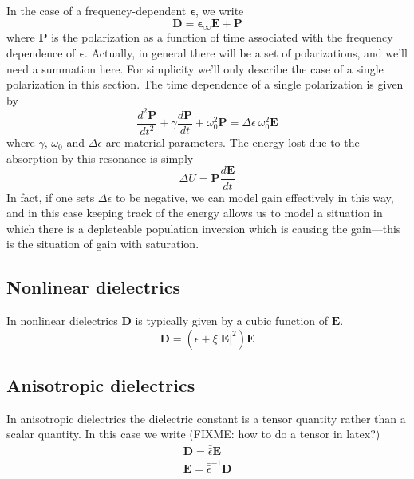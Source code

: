 \documentclass[floats]{book}
\begin{document}
In the case of a frequency-dependent $\mathbf \epsilon$, we write
\begin{equation}
\mathbf D = \mathbf \epsilon_{\infty} \mathbf E + \mathbf P
\end{equation}
where $\mathbf P$ is the polarization as a function of time associated with
the frequency dependence of $\mathbf \epsilon$.  Actually, in general there
will be a set of polarizations, and we'll need a summation here.  For
simplicity we'll only describe the case of a single polarization in this
section.  The time dependence of a single polarization is given by
\begin{equation}
\frac{d^2\mathbf{P}}{dt^2} + \gamma \frac{d\mathbf{P}}{dt}
+ \omega_0^2 \mathbf{P} = \Delta\epsilon\ \omega_0^2 \mathbf{E}
\end{equation}
where $\gamma$, $\omega_0$ and $\Delta\epsilon$ are material parameters.
The energy lost due to the absorption by this resonance is simply
\begin{equation}
\Delta U = \mathbf P \frac{d\mathbf E}{dt}
\end{equation}
In fact, if one sets $\Delta\epsilon$ to be negative, we can model gain
effectively in this way, and in this case keeping track of the energy
allows us to model a situation in which there is a depleteable population
inversion which is causing the gain---this is the situation of gain with
saturation.

\subsection{Nonlinear dielectrics}

In nonlinear dielectrics $\mathbf D$ is typically given by a cubic function
of $\mathbf E$.
\begin{equation}
  \mathbf D = \left(\epsilon + \xi \left|\mathbf E\right|^2 \right)\mathbf E
\end{equation}

\subsection{Anisotropic dielectrics}
In anisotropic dielectrics the dielectric constant is a tensor quantity
rather than a scalar quantity.  In this case we write (FIXME: how to do a
tensor in latex?)
\begin{align}
  \mathbf D = \bar{\bar \epsilon} \mathbf E\\
  \mathbf E = \bar{\bar \epsilon}^{-1} \mathbf D\\
\end{align}
\end{document}
